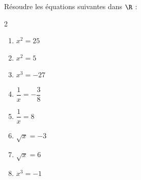 \begin{exo}{}
	Résoudre les équations suivantes dans $\R$ :
	\vspace*{-2mm}
	\begin{multicols}{2}
		\begin{enumerate}[itemsep=2mm]
			\item $x^2 = 25$
			\item $x^2 = 5$
			\item $x^3 = -27$
			\item $\dfrac{1}{x} = -\dfrac{3}{8}$
			\item $\dfrac{1}{x} = 8$
			\item $\sqrt{x} = -3$
			\item $\sqrt{x} = 6$
			\item $x^3 = -1$
		\end{enumerate}
	\end{multicols}\vspace*{-2mm}
\end{exo}
